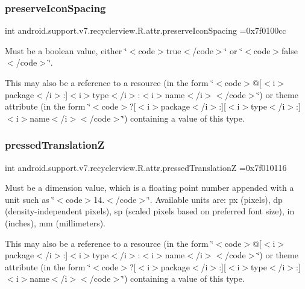 \subsubsection{\texorpdfstring{preserve\+Icon\+Spacing}{preserveIconSpacing}}
{\footnotesize\ttfamily int android.\+support.\+v7.\+recyclerview.\+R.\+attr.\+preserve\+Icon\+Spacing =0x7f0100cc\hspace{0.3cm}{\ttfamily [static]}}

Must be a boolean value, either \char`\"{}$<$code$>$true$<$/code$>$\char`\"{} or \char`\"{}$<$code$>$false$<$/code$>$\char`\"{}. 

This may also be a reference to a resource (in the form \char`\"{}$<$code$>$@\mbox{[}$<$i$>$package$<$/i$>$\+:\mbox{]}$<$i$>$type$<$/i$>$\+:$<$i$>$name$<$/i$>$$<$/code$>$\char`\"{}) or theme attribute (in the form \char`\"{}$<$code$>$?\mbox{[}$<$i$>$package$<$/i$>$\+:\mbox{]}\mbox{[}$<$i$>$type$<$/i$>$\+:\mbox{]}$<$i$>$name$<$/i$>$$<$/code$>$\char`\"{}) containing a value of this type. \mbox{\label{classandroid_1_1support_1_1v7_1_1recyclerview_1_1R_1_1attr_a300ece3326bc93e497d8202b00071740}} 
\subsubsection{\texorpdfstring{pressed\+TranslationZ}{pressedTranslationZ}}
{\footnotesize\ttfamily int android.\+support.\+v7.\+recyclerview.\+R.\+attr.\+pressed\+TranslationZ =0x7f010116\hspace{0.3cm}{\ttfamily [static]}}

Must be a dimension value, which is a floating point number appended with a unit such as \char`\"{}$<$code$>$14.\+5sp$<$/code$>$\char`\"{}. Available units are\+: px (pixels), dp (density-\/independent pixels), sp (scaled pixels based on preferred font size), in (inches), mm (millimeters). 

This may also be a reference to a resource (in the form \char`\"{}$<$code$>$@\mbox{[}$<$i$>$package$<$/i$>$\+:\mbox{]}$<$i$>$type$<$/i$>$\+:$<$i$>$name$<$/i$>$$<$/code$>$\char`\"{}) or theme attribute (in the form \char`\"{}$<$code$>$?\mbox{[}$<$i$>$package$<$/i$>$\+:\mbox{]}\mbox{[}$<$i$>$type$<$/i$>$\+:\mbox{]}$<$i$>$name$<$/i$>$$<$/code$>$\char`\"{}) containing a value of this type. \mbox{\label{classandroid_1_1support_1_1v7_1_1recyclerview_1_1R_1_1attr_a1eddb072ecdbfcdc4d0cf8c9c41999ed}} 
